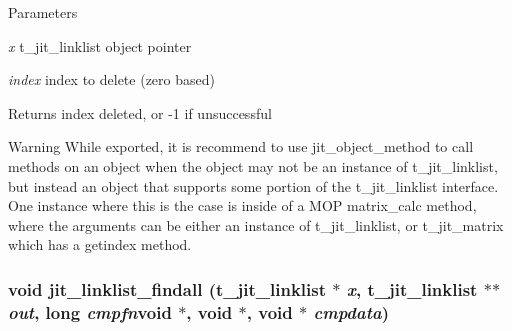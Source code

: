 \begin{DoxyParams}{Parameters}
\item[{\em x}]t\_\-jit\_\-linklist object pointer \item[{\em index}]index to delete (zero based)\end{DoxyParams}
\begin{DoxyReturn}{Returns}
index deleted, or -\/1 if unsuccessful
\end{DoxyReturn}
\begin{DoxyWarning}{Warning}
While exported, it is recommend to use jit\_\-object\_\-method to call methods on an object when the object may not be an instance of t\_\-jit\_\-linklist, but instead an object that supports some portion of the t\_\-jit\_\-linklist interface. One instance where this is the case is inside of a MOP matrix\_\-calc method, where the arguments can be either an instance of t\_\-jit\_\-linklist, or t\_\-jit\_\-matrix which has a getindex method. 
\end{DoxyWarning}
\hypertarget{group__linklistmod_ga0d8554428ade7ae33962323087eb1809}{
\subsubsection[{jit\_\-linklist\_\-findall}]{\setlength{\rightskip}{0pt plus 5cm}void jit\_\-linklist\_\-findall (t\_\-jit\_\-linklist $\ast$ {\em x}, \/  t\_\-jit\_\-linklist $\ast$$\ast$ {\em out}, \/  long  {\em cmpfn}void $\ast$, void $\ast$, \/  void $\ast$ {\em cmpdata})}}
\label{group__linklistmod_ga0d8554428ade7ae33962323087eb1809}



